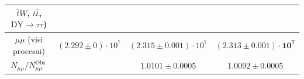 \documentclass[xcolor=dvipsnames]{beamer}
\newcommand{\mumu}{\mu\mu}
\newcommand{\DYtau}{\mathrm{DY} \! \rightarrow \! \tau\tau}
\begin{document}
\begin{frame}
\begin{tabular}{|c|c|c|c|}
	$\bar{t}W$, $t\bar{t}$, $\DYtau$) & & & \\
	\hline
	
	\multirow{2}{7em}{\centering $\mumu$ (visi procesai)} &
	\multirow{2}{9em}{\centering $(2.292 \pm 0) \cdot 10^7$} &
	\multirow{2}{9em}{\centering $(2.315 \pm 0.001) \cdot 10^7$} &
	\multirow{2}{10em}{\centering $\mathbf{(2.313 \pm 0.001) \cdot 10^7}$} \\
	
 	& & & \\
	\hline
	
	\multirow{2}{7em}{\centering $N_{\mumu}/N_{\mumu}^{\mathrm{Obs.}}$} &
	\multirow{2}{9em}{\centering \textendash} &
	\multirow{2}{9em}{\centering $1.0101 \pm 0.0005$} &
	\multirow{2}{10em}{\centering $1.0092 \pm 0.0005$} \\
	
 	& & & \\
	\hline
	\end{tabular}
\end{frame}
\end{document}
